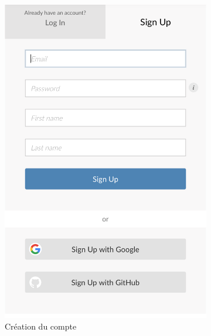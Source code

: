 \documentclass[10.5pt,a4paper]{article}
\begin{document}
\begin{figure}[H]
\centering
\begin{subfigure}{.5\textwidth}
  \centering
  \includegraphics[width=.8\linewidth]{login.png}
  \caption{Création du compte}
  \label{login}
\end{subfigure}%
\begin{subfigure}{.5\textwidth}
  \centering

\end{subfigure}
\end{figure}
\end{document}
